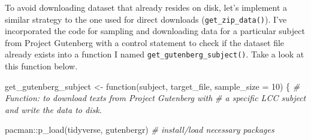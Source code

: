 \documentclass[
  letterpaper,
]{scrbook}
\newenvironment{Shaded}{\begin{snugshade}}{\end{snugshade}}
\newcommand{\AttributeTok}[1]{\textcolor[rgb]{0.00,0.00,0.00}{#1}}
\newcommand{\CommentTok}[1]{\textcolor[rgb]{0.00,0.00,0.00}{\textit{#1}}}
\newcommand{\ControlFlowTok}[1]{\textcolor[rgb]{0.00,0.00,0.00}{#1}}
\newcommand{\DecValTok}[1]{\textcolor[rgb]{0.00,0.00,0.00}{#1}}
\newcommand{\FunctionTok}[1]{\textcolor[rgb]{0.00,0.00,0.00}{#1}}
\newcommand{\NormalTok}[1]{\textcolor[rgb]{0.00,0.00,0.00}{#1}}
\newcommand{\OtherTok}[1]{\textcolor[rgb]{0.00,0.00,0.00}{#1}}
\newcommand{\SpecialCharTok}[1]{\textcolor[rgb]{0.00,0.00,0.00}{#1}}
\begin{document}
To avoid downloading dataset that already resides on disk, let's
implement a similar strategy to the one used for direct downloads
(\texttt{get\_zip\_data()}). I've incorporated the code for sampling and
downloading data for a particular subject from Project Gutenberg with a
control statement to check if the dataset file already exists into a
function I named \texttt{get\_gutenberg\_subject()}. Take a look at this
function below.

\begin{Shaded}
\begin{Highlighting}[]
\NormalTok{get\_gutenberg\_subject }\OtherTok{\textless{}{-}} \ControlFlowTok{function}\NormalTok{(subject, target\_file, }\AttributeTok{sample\_size =} \DecValTok{10}\NormalTok{) \{}
  \CommentTok{\# Function: to download texts from Project Gutenberg with }
  \CommentTok{\# a specific LCC subject and write the data to disk.}
  
\NormalTok{  pacman}\SpecialCharTok{::}\FunctionTok{p\_load}\NormalTok{(tidyverse, gutenbergr) }\CommentTok{\# install/load necessary packages}
  

\end{Highlighting}
\end{Shaded}
\end{document}
